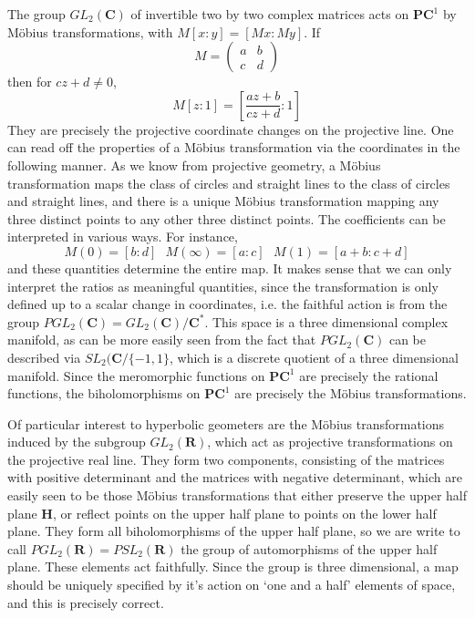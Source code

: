 The group $GL_2(\mathbf{C})$ of invertible two by two complex matrices acts on $\mathbf{PC}^1$ by M\"{o}bius transformations, with $M[x:y] = [Mx: My]$. If
%
\[ M = \begin{pmatrix} a & b \\ c & d \end{pmatrix} \]
%
then for $cz + d \neq 0$,
%
\[ M[z:1] = \left[ \frac{az + b}{cz + d}: 1 \right] \]
%
They are precisely the projective coordinate changes on the projective line. One can read off the properties of a M\"{o}bius transformation via the coordinates in the following manner. As we know from projective geometry, a M\"{o}bius transformation maps the class of circles and straight lines to the class of circles and straight lines, and there is a unique M\"{o}bius transformation mapping any three distinct points to any other three distinct points. The coefficients can be interpreted in various ways. For instance,
%
\[ M(0) = [b:d]\ \ \ M(\infty) = [a:c]\ \ \ M(1) = [a+b:c+d] \]
%
and these quantities determine the entire map. It makes sense that we can only interpret the ratios as meaningful quantities, since the transformation is only defined up to a scalar change in coordinates, i.e. the faithful action is from the group $PGL_2(\mathbf{C}) = GL_2(\mathbf{C})/\mathbf{C}^*$. This space is a three dimensional complex manifold, as can be more easily seen from the fact that $PGL_2(\mathbf{C})$ can be described via $SL_2(\mathbf{C}/\{ -1, 1 \}$, which is a discrete quotient of a three dimensional manifold. Since the meromorphic functions on $\mathbf{PC}^1$ are precisely the rational functions, the biholomorphisms on $\mathbf{PC}^1$ are precisely the M\"{o}bius transformations.

Of particular interest to hyperbolic geometers are the M\"{o}bius transformations induced by the subgroup $GL_2(\mathbf{R})$, which act as projective transformations on the projective real line. They form two components, consisting of the matrices with positive determinant and the matrices with negative determinant, which are easily seen to be those M\"{o}bius transformations that either preserve the upper half plane $\mathbf{H}$, or reflect points on the upper half plane to points on the lower half plane. They form all biholomorphisms of the upper half plane, so we are write to call $PGL_2(\mathbf{R}) = PSL_2(\mathbf{R})$ the group of automorphisms of the upper half plane. These elements act faithfully. Since the group is three dimensional, a map should be uniquely specified by it's action on `one and a half' elements of space, and this is precisely correct.

